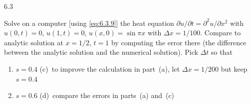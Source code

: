 \begin{exercises}{6.3}
\item Solve on a computer [using \eqref{eq:6.3.9}] the heat equation $\partial u/\partial t = \partial^2 u/\partial x^2$ with $u(0,t) = 0$, $u(1,t) = 0$, $u(x,0) = \sin\pi x$ with $\Delta x = 1/100$.  Compare to analytic solution at $x = 1/2$, $t = 1$ by computing the error there (the difference between the analytic solution and the numerical solution).  Pick $\Delta t$ so that
\begin{enumerate}
\item[(a)] $s = 0.4$ \qquad (c)~to improve the calculation in part~(a), let $\Delta x = 1/200$ but keep $s = 0.4$
\item[(b)] $s = 0.6$ \qquad (d)~compare the errors in parts~(a) and~(c)
\end{enumerate}
\end{exercises}
